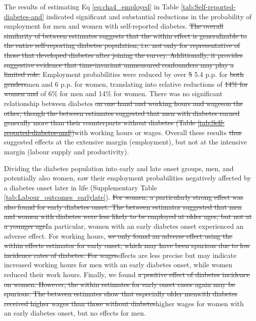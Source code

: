 \documentclass[12pt,english]{article}
\providecommand{\DIFaddtex}[1]{{\protect\color{blue}#1}} %
\providecommand{\DIFdeltex}[1]{{\protect\color{red}\sout{#1}}}                      %
\providecommand{\DIFaddbegin}{} %
\providecommand{\DIFaddend}{} %
\providecommand{\DIFdelbegin}{} %
\providecommand{\DIFdelend}{} %
\providecommand{\DIFadd}[1]{\texorpdfstring{\DIFaddtex{#1}}{#1}} %
\providecommand{\DIFdel}[1]{\texorpdfstring{\DIFdeltex{#1}}{}} %
\begin{document}
The results of estimating Eq \ref{eq:cha4_employed} in Table \ref{tab:Self-reported-diabetes-and} indicated significant and substantial reductions in the probability of employment for men and women with self-reported diabetes. \DIFdelbegin \DIFdel{The overall similarity of between estimates suggests that the within effect is generalizable to the entire self-reporting diabetes population, i.e. not only for representative of those that developed diabetes after joining the survey. Additionally, it provides suggestive evidence that time-invariant unmeasured confounders may play a limited role. }\DIFdelend Employment probabilities were reduced by over \DIFdelbegin \DIFdel{5 }\DIFdelend \DIFaddbegin \DIFadd{5.4 }\DIFaddend \ac{p.p.} for \DIFdelbegin \DIFdel{both genders}\DIFdelend \DIFaddbegin \DIFadd{men and 6 }\ac{p.p.} \DIFadd{for women}\DIFaddend , translating into relative reductions of  \DIFdelbegin \DIFdel{14\% for women and }\DIFdelend of 6\% for men \DIFaddbegin \DIFadd{and 14\% for women}\DIFaddend . There was no significant relationship between diabetes \DIFdelbegin \DIFdel{on one hand and working hours and wageson the other, though the between estimates suggested that men with diabetes earned generally more than their counterparts without diabetes (Table \ref{tab:Self-reported-diabetes-and})}\DIFdelend \DIFaddbegin \DIFadd{with working hours or wages}\DIFaddend . Overall these results \DIFdelbegin \DIFdel{thus }\DIFdelend suggested effects at the extensive margin (employment), but not at the intensive margin (labour supply and productivity). 

Dividing the diabetes population into early and late onset groups, men, and potentially also women, saw their employment probabilities negatively affected by a diabetes onset later in life (Supplementary Table \ref{tab:Labour_outcomes_earlylate}). \DIFdelbegin \DIFdel{For women, a particularly strong effect was also found for early diabetes onset. The between estimator suggested that men and women with diabetes were less likely to be employed at older ages, but not at a younger age}\DIFdelend \DIFaddbegin \DIFadd{In particular, women with an early diabetes onset experienced an adverse effect}\DIFaddend . For working hours, \DIFdelbegin \DIFdel{we only found an adverse effect using the within effects estimator for early onset, which may have been spurious due to low incidence rates of diabetes. For wages}\DIFdelend \DIFaddbegin \DIFadd{effects are less precise but may indicate increased working hours for men with an early diabetes onset, while women reduced their work hours. Finally}\DIFaddend , we found \DIFdelbegin \DIFdel{a positive effect of diabetes incidence on women. However, the within estimates for early onset cases again may be spurious. The between estimates show that especially older menwith diabetes received higher wages than those without diabetes}\DIFdelend \DIFaddbegin \DIFadd{higher wages for women with an early diabetes onset, but no effects for men}\DIFaddend . 
\end{document}
